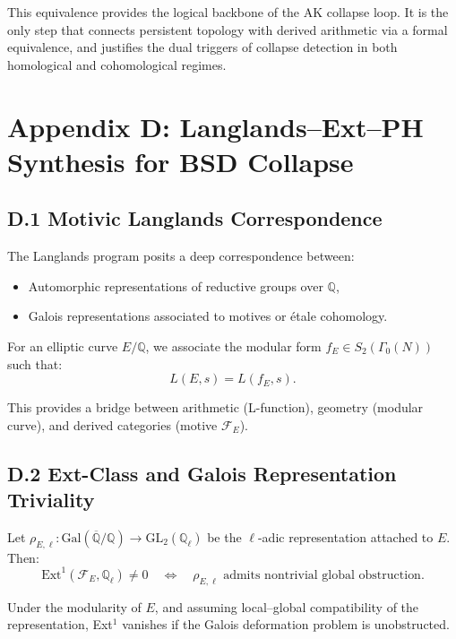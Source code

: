 \begin{remark}
This equivalence provides the logical backbone of the AK collapse loop.  
It is the only step that connects persistent topology with derived arithmetic via a formal equivalence,  
and justifies the dual triggers of collapse detection in both homological and cohomological regimes.
\end{remark}



\section*{Appendix D: Langlands--Ext--PH Synthesis for BSD Collapse}

\subsection*{D.1 Motivic Langlands Correspondence}

The Langlands program posits a deep correspondence between:
\begin{itemize}
  \item Automorphic representations of reductive groups over \( \mathbb{Q} \),
  \item Galois representations associated to motives or étale cohomology.
\end{itemize}

For an elliptic curve \( E/\mathbb{Q} \), we associate the modular form \( f_E \in S_2(\Gamma_0(N)) \) such that:
\[
L(E, s) = L(f_E, s).
\]

This provides a bridge between arithmetic (L-function), geometry (modular curve), and derived categories (motive \( \mathcal{F}_E \)).

\subsection*{D.2 Ext-Class and Galois Representation Triviality}

Let \( \rho_{E, \ell} : \mathrm{Gal}(\overline{\mathbb{Q}}/\mathbb{Q}) \to \mathrm{GL}_2(\mathbb{Q}_\ell) \) be the \(\ell\)-adic representation attached to \( E \).  
Then:
\[
\mathrm{Ext}^1(\mathcal{F}_E, \mathbb{Q}_\ell) \neq 0
\quad \Leftrightarrow \quad
\rho_{E,\ell} \text{ admits nontrivial global obstruction}.
\]

Under the modularity of \( E \), and assuming local–global compatibility of the representation, Ext$^1$ vanishes if the Galois deformation problem is unobstructed.

